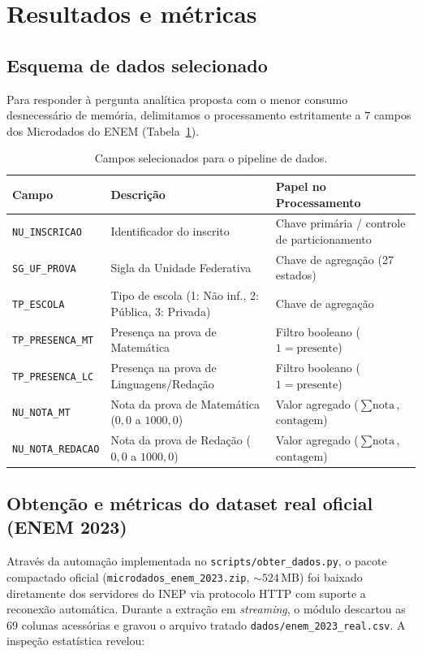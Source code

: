 \section{Resultados e métricas}

\subsection{Esquema de dados selecionado}
Para responder à pergunta analítica proposta com o menor consumo desnecessário de
memória, delimitamos o processamento estritamente a $7$ campos dos Microdados do
ENEM (Tabela~\ref{tab:esquema}).

\begin{table}[H]
  \centering
  \small
  \begin{tabularx}{\textwidth}{lXl}
    \toprule
    \textbf{Campo} & \textbf{Descrição} & \textbf{Papel no Processamento} \\
    \midrule
    \texttt{NU\_INSCRICAO} & Identificador do inscrito & Chave primária / controle de particionamento \\
    \texttt{SG\_UF\_PROVA} & Sigla da Unidade Federativa & Chave de agregação (27 estados) \\
    \texttt{TP\_ESCOLA} & Tipo de escola (1: Não inf., 2: Pública, 3: Privada) & Chave de agregação \\
    \texttt{TP\_PRESENCA\_MT} & Presença na prova de Matemática & Filtro booleano ($1 = \text{presente}$) \\
    \texttt{TP\_PRESENCA\_LC} & Presença na prova de Linguagens/Redação & Filtro booleano ($1 = \text{presente}$) \\
    \texttt{NU\_NOTA\_MT} & Nota da prova de Matemática ($0{,}0$ a $1000{,}0$) & Valor agregado ($\sum \text{nota}$, $\text{contagem}$) \\
    \texttt{NU\_NOTA\_REDACAO} & Nota da prova de Redação ($0{,}0$ a $1000{,}0$) & Valor agregado ($\sum \text{nota}$, $\text{contagem}$) \\
    \bottomrule
  \end{tabularx}
  \caption{Campos selecionados para o pipeline de dados.}
  \label{tab:esquema}
\end{table}

\subsection{Obtenção e métricas do dataset real oficial (ENEM 2023)}
Através da automação implementada no \texttt{scripts/obter\_dados.py}, o pacote
compactado oficial (\texttt{microdados\_enem\_2023.zip}, $\sim 524$\,MB) foi
baixado diretamente dos servidores do INEP via protocolo HTTP com suporte a
reconexão automática. Durante a extração em \emph{streaming}, o módulo descartou
as $69$ colunas acessórias e gravou o arquivo tratado
\texttt{dados/enem\_2023\_real.csv}. A inspeção estatística revelou:

